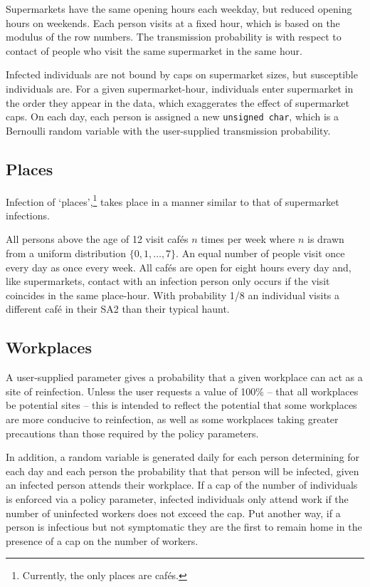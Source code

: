 \documentclass{grattan}
\newcommand*{\code}[1]{\texttt{#1}}
\begin{document}
Supermarkets have the same opening hours each weekday, but reduced opening hours on weekends.
Each person visits at a fixed hour, which is based on the modulus of the row numbers. The transmission
probability is with respect to contact of people who visit the same supermarket in the same hour. 

Infected individuals are not bound by caps on supermarket sizes, but susceptible individuals are.
For a given supermarket-hour, individuals enter supermarket in the order they appear in the data,
which exaggerates the effect of supermarket caps. On each day, each person is assigned a
new \code{unsigned char}, which is a Bernoulli random variable with the user-supplied 
transmission probability. 

\subsection{Places}

Infection of `places',\footnote{Currently, the only places are caf\'{e}s.}
takes place in a manner similar to that of supermarket infections.

All persons above the age of 12 visit caf\'es \(n\)
times per week where \(n\) is drawn from a 
uniform distribution \(\{0, 1, \dots, 7\}\). An equal number of people
visit once every day as once every week. All caf\'es are open for eight
hours every day and, like supermarkets, contact with an infection person 
only occurs if the visit coincides in the same place-hour. With probability
1/8 an individual visits a different caf\'e in their SA2 than their typical
haunt.

\subsection{Workplaces}

A user-supplied parameter gives a probability that a given workplace can act as a site
of reinfection. Unless the user requests a value of 100\% -- that all workplaces 
be potential sites -- this is intended to reflect the potential that some workplaces are more
conducive to reinfection, as well as some workplaces taking greater precautions than those 
required by the policy parameters. 

In addition, a random variable is generated daily for each person determining for each day 
and each person the probability that that person will be infected, given an infected person
attends their workplace. If a cap of the number of individuals is enforced via a policy 
parameter, infected individuals only attend work if the number of uninfected workers does 
not exceed the cap. Put another way, if a person is infectious but not symptomatic they are 
the first to remain home in the presence of a cap on the number of workers.
\end{document}
